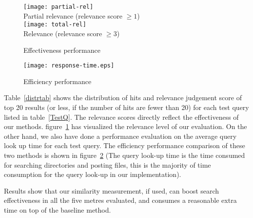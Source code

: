 \begin{figure}
\begin{center}
\texttt{[image: partial-rel]}
\\Partial relevance (relevance score $\ge 1$)
\\[0.4in]
\texttt{[image: total-rel]}
\\ Relevance (relevance score $\ge 3$)
\end{center}
\caption{Effectiveness performance}\label{perfcomp}
\end{figure}

\begin{figure}
\begin{center}
\texttt{[image: response-time.eps]}
\end{center}
\caption{Efficiency performance}\label{effiperf}
\end{figure}

Table~\ref{distrtab} shows the distribution of hits and relevance judgement score of top 20 results (or less, if the number of hits are fewer than 20) for each test query listed in table~\ref{TestQ}.
The relevance scores directly reflect the effectiveness of our methods.
figure~\ref{perfcomp} has visualized the relevance level of our evaluation.
On the other hand,
we also have done a performance evaluation on the average query look up time for each test query.
The efficiency performance comparison of these two methods is shown in figure~\ref{effiperf} 
(The query look-up time is the time consumed for searching directories and posting files, this is the majority of time consumption for the query look-up in our implementation).

Results show that our similarity measurement, if used, can boost search effectiveness in all the five metres evaluated, 
and consumes a reasonable extra time on top of the baseline method. 
